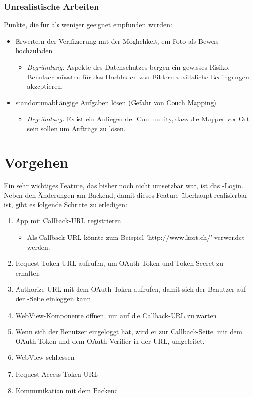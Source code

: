 \subsubsection{Unrealistische Arbeiten}
Punkte, die für \kort{} als weniger geeignet empfunden wurden:

\begin{itemize}
	\item Erweitern der Verifizierung mit der Möglichkeit, ein Foto als Beweis hochzuladen
	\begin{itemize}
	  \item \emph{Begründung:} Aspekte des Datenschutzes bergen ein gewisses Risiko. Benutzer müssten für das Hochladen von Bildern zusätzliche Bedingungen akzeptieren.
	\end{itemize}
	\item standortunabhängige Aufgaben lösen (Gefahr von Couch Mapping)
	\begin{itemize}
	  \item \emph{Begründung:} Es ist ein Anliegen der  Community, dass die Mapper vor Ort sein sollen um Aufträge zu lösen. 
	\end{itemize}
\end{itemize}

\section{Vorgehen}
\label{pd-weiterentwicklung-vorgehen}
Ein sehr wichtiges Feature, das bisher noch nicht umsetzbar war, ist das -Login.
Neben den Änderungen am Backend, damit dieses Feature überhaupt realisierbar ist, gibt es folgende Schritte zu erledigen:

\begin{enumerate}
	\item App mit Callback-URL registrieren
	\begin{itemize}
		\item Als Callback-URL könnte zum Beispiel 'http://www.kort.ch/' verwendet werden.
	\end{itemize}
	\item Request-Token-URL aufrufen, um OAuth-Token und Token-Secret zu erhalten
	\item Authorize-URL mit dem OAuth-Token aufrufen, damit sich der Benutzer auf der -Seite einloggen kann
	\item WebView-Komponente öffnen, um auf die Callback-URL zu warten 
	\item Wenn sich der Benutzer eingeloggt hat, wird er zur Callback-Seite, mit dem OAuth-Token und dem OAuth-Verifier in der URL, umgeleitet.
	\item WebView schliessen
	\item Request Access-Token-URL
	\item Kommunikation mit dem Backend
\end{enumerate}

